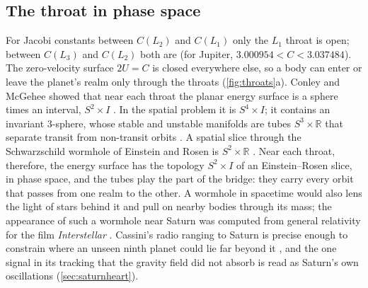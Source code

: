 \documentclass[11pt]{article}
\theoremstyle{definition}\newtheorem{definition}[theorem]{Definition}
\theoremstyle{remark}\newtheorem{remark}[theorem]{Remark}
\newcommand{\R}{\mathbb R}\newcommand{\C}{\mathbb C}\newcommand{\N}{\mathbb N}
\begin{document}
\subsection{The throat in phase space}\label{sec:topology}
For Jacobi constants between $C(L_2)$ and $C(L_1)$ only the $L_1$ throat is open; between $C(L_3)$ and $C(L_2)$ both are (for Jupiter, $3.000954<C<3.037484$). The zero-velocity surface $2U=C$ is closed everywhere else, so a body can enter or leave the planet's realm only through the throats (\cref{fig:throats}a). Conley and McGehee showed that near each throat the planar energy surface is a sphere times an interval, $S^2\times I$ \cite{Conley,McGehee}. In the spatial problem it is $S^4\times I$; it contains an invariant $3$-sphere, whose stable and unstable manifolds are tubes $S^3\times\R$ that separate transit from non-transit orbits \cite{KLMR,Gomez}. A spatial slice through the Schwarzschild wormhole of Einstein and Rosen \cite{ER} is $S^2\times\R$ \cite{MTW}. Near each throat, therefore, the energy surface has the topology $S^2\times I$ of an Einstein--Rosen slice, in phase space, and the tubes play the part of the bridge: they carry every orbit that passes from one realm to the other. A wormhole in spacetime would also lens the light of stars behind it and pull on nearby bodies through its mass; the appearance of such a wormhole near Saturn was computed from general relativity for the film \emph{Interstellar} \cite{JamesWormhole}. Cassini's radio ranging to Saturn is precise enough to constrain where an unseen ninth planet could lie far beyond it \cite{Fienga}, and the one signal in its tracking that the gravity field did not absorb is read as Saturn's own oscillations (\cref{sec:saturnheart}).
\end{document}
